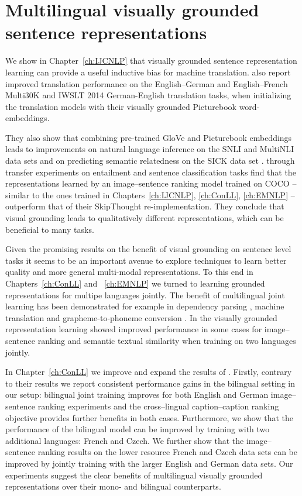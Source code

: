 \section{Multilingual visually grounded sentence representations}

We show in Chapter~\ref{ch:IJCNLP} that visually grounded sentence representation learning
can provide a useful inductive bias for machine translation. \cite{kiros2018illustrative} also report 
improved translation performance on the English--German and English--French Multi30K 
and IWSLT 2014 German-English  \citep{cettolo2014report} translation tasks, when initializing
the translation models with their visually grounded Picturebook word-embeddings. 

They also show that
combining pre-trained GloVe \citep{pennington2014glove} and Picturebook embeddings leads 
to improvements on natural language inference on the SNLI 
\citep{bowman2015large} and MultiNLI \citep{williams2017broad} data sets and on predicting
semantic relatedness on the SICK data set \citep{marelli2014semeval}. 
\cite{kiela2017learning} through transfer experiments on
entailment and sentence classification tasks find that the representations learned by an 
image--sentence ranking model trained on COCO -- similar to the ones trained in Chapters~\ref{ch:IJCNLP}, 
\ref{ch:ConLL}, \ref{ch:EMNLP}  -- outperform that of their SkipThought \citep{kiros2015skip} 
re-implementation. They conclude that visual grounding leads to qualitatively different representations, which
can be beneficial to many tasks.

Given the promising results on the benefit of visual grounding on sentence level tasks it seems
to be an important avenue to explore techniques to learn better quality and more 
general multi-modal representations. To this end in Chapters~\ref{ch:ConLL} and ~\ref{ch:EMNLP} 
we turned to learning grounded representations for multipe languages jointly. 
The benefit of multilingual joint learning has been demonstrated for example in dependency parsing
 \citep{ammar2016many}, machine translation \citep{johnson2016google} and grapheme-to-phoneme
 conversion \citep{peters2017massively}. 
 In the visually grounded representation learning \cite{gella2017image} showed improved 
 performance in some cases for image--sentence ranking and semantic textual similarity when training
 on two languages jointly.
 
  In Chapter~\ref{ch:ConLL} we improve and expand the results of 
 \cite{gella2017image}. Firstly, contrary to their results we report consistent performance gains in the
 bilingual setting in our setup: bilingual joint training improves for both English and German 
 image--sentence ranking experiments and the cross--lingual caption--caption ranking 
 objective provides further benefits in both cases. 
 Furthermore, we show that the performance of the bilingual model can be improved by training
 with two additional languages: French and Czech. We further show that the image--sentence ranking
 results on the lower resource French and Czech data sets can be improved by jointly training with the
 larger English and German data sets. 
Our experiments suggest the clear benefits of multilingual visually grounded representations over 
their mono- and bilingual counterparts.
 

